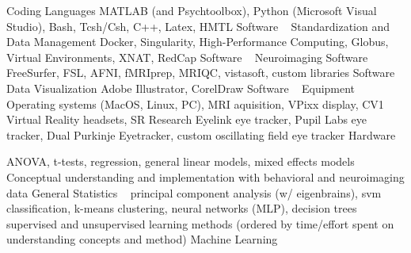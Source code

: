 \begin{cvhonors}
  \cvhonor
    {Coding Languages}
    {MATLAB (and Psychtoolbox), Python (Microsoft Visual Studio), Bash, Tcsh/Csh, C++, Latex, HMTL}
    {Software}
    {~}
  \cvhonor
    {Standardization and Data Management}
    {Docker, Singularity, High-Performance Computing, Globus, Virtual Environments, XNAT, RedCap}
    {Software}
    {~}
  \cvhonor
    {Neuroimaging Software}
    {FreeSurfer, FSL, AFNI, fMRIprep, MRIQC, vistasoft, custom libraries}
    {Software}
    {~}
  \cvhonor
    {Data Visualization}
    {Adobe Illustrator, CorelDraw}
    {Software}
    {~}
  \cvhonor
    {Equipment}
    {Operating systems (MacOS, Linux, PC), MRI aquisition, VPixx display, CV1 Virtual Reality headsets, SR Research Eyelink eye tracker, Pupil Labs eye tracker, Dual Purkinje Eyetracker, custom oscillating field eye tracker}
    {Hardware}
    {~}
\end{cvhonors}
\begin{cvhonors}
  \cvhonor
    {ANOVA, t-tests, regression, general linear models, mixed effects models}
    {Conceptual understanding and implementation with behavioral and neuroimaging data}
    {General Statistics}
    {~}
  \cvhonor
    {principal component analysis (w/ eigenbrains), svm classification, k-means clustering, neural networks (MLP), decision trees}
    {supervised and unsupervised learning methods (ordered by time/effort spent on understanding concepts and method)}
    {Machine Learning}
    {~}
\end{cvhonors}
